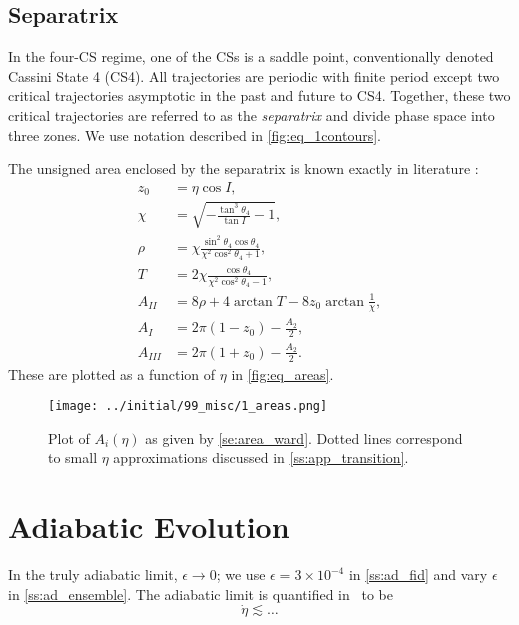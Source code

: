 \documentclass[
        fleqn,
        usenatbib,
    ]{mnras}
\newcommand*{\p}[1]{\left(#1\right)}
\begin{document}
\subsection{Separatrix}

In the four-CS regime, one of the CSs is a saddle point, conventionally denoted
Cassini State 4 (CS4). All trajectories are periodic with finite period except
two critical trajectories asymptotic in the past and future to CS4. Together,
these two critical trajectories are referred to as the \emph{separatrix} and
divide phase space into three zones. We use notation described in
\autoref{fig:eq_1contours}.

The unsigned area enclosed by the separatrix is known exactly in literature
\citep{henrard1987,ward2004I}:
\begin{subequations}\label{se:area_ward}
    \begin{align}
        z_0 &= \eta\cos I,\nonumber\\
        \chi &= \sqrt{-\frac{\tan^3\theta_4}{\tan I} - 1},\nonumber\\
        \rho &= \chi \frac{\sin^2 \theta_4\cos \theta_4}{
            \chi^2 \cos^2\theta_4 + 1},\nonumber\\
        T &= 2\chi \frac{\cos \theta_4}{
            \chi^2 \cos^2\theta_4 - 1},\nonumber\\
        A_{II} &= 8\rho + 4\arctan T - 8z_0 \arctan \frac{1}{\chi},\\
        A_I &= 2\pi\p{1 - z_0} - \frac{A_2}{2},\\
        A_{III} &= 2\pi\p{1 + z_0} - \frac{A_2}{2}.
    \end{align}
\end{subequations}
These are plotted as a function of $\eta$ in \autoref{fig:eq_areas}.
\begin{figure}
    \centering
    \texttt{[image: ../initial/99\_misc/1\_areas.png]}
    \caption{Plot of $A_{i}(\eta)$ as given by \autoref{se:area_ward}. Dotted
    lines correspond to small $\eta$ approximations discussed in
    \autoref{ss:app_transition}.}\label{fig:eq_areas}
\end{figure}

\section{Adiabatic Evolution}\label{s:ad}

In the truly adiabatic limit, $\epsilon \to 0$; we use $\epsilon =
3 \times 10^{-4}$ in \autoref{ss:ad_fid} and vary $\epsilon$ in
\autoref{ss:ad_ensemble}. The adiabatic limit is quantified
in~\cite{millholland_disk} to be
\begin{equation}
    \dot{\eta} \lesssim \dots \label{eq:ad_constr}
\end{equation}
\end{document}
